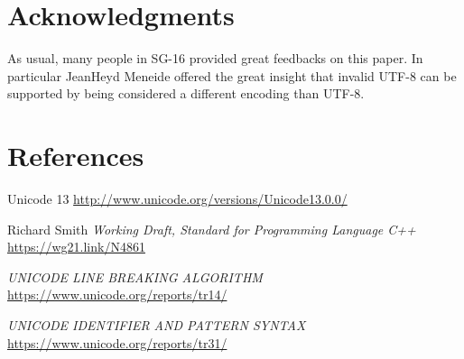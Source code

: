 \documentclass{wg21}
\begin{document}
%

\section{Acknowledgments}

As usual, many people in SG-16 provided great feedbacks on this paper.
In particular JeanHeyd Meneide offered the great insight that invalid UTF-8 can be supported by being considered a different encoding than UTF-8.


\section{References}
\renewcommand{\section}[2]{}%



\begin{thebibliography}{9}


    Unicode 13\newline
    \url{http://www.unicode.org/versions/Unicode13.0.0/}


    Richard Smith
    \emph{Working Draft, Standard for Programming Language C++}\newline
    \url{https://wg21.link/N4861}


    \emph{UNICODE LINE BREAKING ALGORITHM}\newline
    \url{https://www.unicode.org/reports/tr14/}

    \emph{UNICODE IDENTIFIER AND PATTERN SYNTAX}\newline
    \url{https://www.unicode.org/reports/tr31/}

\end{thebibliography}
\end{document}
